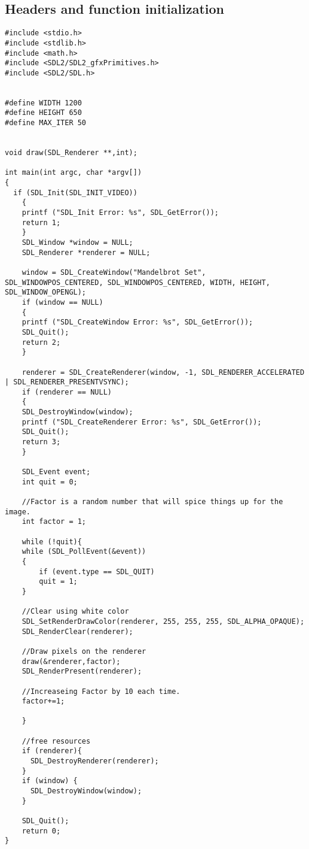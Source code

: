 \documentclass[a4paper,11pt]{article}
\begin{document}
\subsection{Headers and function initialization}
\label{sec:org3a00f30}
\begin{verbatim}
#include <stdio.h>
#include <stdlib.h>
#include <math.h>
#include <SDL2/SDL2_gfxPrimitives.h>
#include <SDL2/SDL.h>


#define WIDTH 1200
#define HEIGHT 650
#define MAX_ITER 50


void draw(SDL_Renderer **,int);

int main(int argc, char *argv[])
{
  if (SDL_Init(SDL_INIT_VIDEO))
    {
	printf ("SDL_Init Error: %s", SDL_GetError());
	return 1;
    }
    SDL_Window *window = NULL;
    SDL_Renderer *renderer = NULL;

    window = SDL_CreateWindow("Mandelbrot Set", SDL_WINDOWPOS_CENTERED, SDL_WINDOWPOS_CENTERED, WIDTH, HEIGHT, SDL_WINDOW_OPENGL);
    if (window == NULL)
    {
	printf ("SDL_CreateWindow Error: %s", SDL_GetError());
	SDL_Quit();
	return 2;
    }

    renderer = SDL_CreateRenderer(window, -1, SDL_RENDERER_ACCELERATED | SDL_RENDERER_PRESENTVSYNC);
    if (renderer == NULL)
    {
	SDL_DestroyWindow(window);
	printf ("SDL_CreateRenderer Error: %s", SDL_GetError());
	SDL_Quit();
	return 3;
    }

    SDL_Event event;
    int quit = 0;

    //Factor is a random number that will spice things up for the image.
    int factor = 1;

    while (!quit){
	while (SDL_PollEvent(&event))
	{
	    if (event.type == SDL_QUIT)
		quit = 1;
	}

	//Clear using white color
	SDL_SetRenderDrawColor(renderer, 255, 255, 255, SDL_ALPHA_OPAQUE);
	SDL_RenderClear(renderer);

	//Draw pixels on the renderer
	draw(&renderer,factor);
	SDL_RenderPresent(renderer);

	//Increaseing Factor by 10 each time.
	factor+=1;

    }

    //free resources
    if (renderer){
      SDL_DestroyRenderer(renderer);
    }
    if (window) {
      SDL_DestroyWindow(window);      
    }

    SDL_Quit();
    return 0;
}

\end{verbatim}
\end{document}
